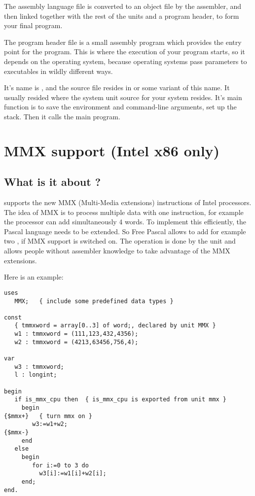 \documentclass{report}
\begin{document}
The assembly language file is converted to an object file by the assembler,
and then linked together with the rest of the units and a program header, to
form your final program.

The program header file is a small assembly program which provides the entry
point for the program. This is where the execution of your program starts,
so it depends on the operating system, because operating systems pass
parameters to executables in wildly different ways.

It's name is , and the
source file resides in  or some variant of this name. It
usually resided where the system unit source for your system resides.
It's main function is to save the environment and command-line arguments,
set up the stack. Then it calls the main program.

\chapter{MMX support (Intel x86 only) }
\label{ch:MMXSupport}

\section{What is it about ?}
\label{se:WhatisMMXabout}
\fpc supports the new MMX (Multi-Media extensions)
instructions of Intel processors. The idea of MMX is to
process multiple data with one instruction, for example the processor
can add simultaneously 4 words. To implement this efficiently, the
Pascal language needs to be extended. So Free Pascal allows
to add for example two ,
if MMX support is switched on. The operation is done
by the  unit and allows people without assembler knowledge to take
advantage of the MMX extensions.

Here is an example:
\begin{verbatim}
uses
   MMX;   { include some predefined data types }

const
   { tmmxword = array[0..3] of word;, declared by unit MMX }
   w1 : tmmxword = (111,123,432,4356);
   w2 : tmmxword = (4213,63456,756,4);

var
   w3 : tmmxword;
   l : longint;

begin
   if is_mmx_cpu then  { is_mmx_cpu is exported from unit mmx }
     begin
{$mmx+}   { turn mmx on }
        w3:=w1+w2;
{$mmx-}
     end
   else
     begin
        for i:=0 to 3 do
          w3[i]:=w1[i]+w2[i];
     end;
end.
\end{verbatim}
\end{document}
